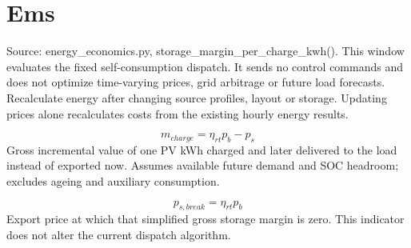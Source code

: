 \documentclass[10pt,a4paper]{article}
\begin{document}
\section{Ems}
Source: energy\_economics.py, storage\_margin\_per\_charge\_kwh(). This window evaluates the fixed self-consumption dispatch. It sends no control commands and does not optimize time-varying prices, grid arbitrage or future load forecasts. Recalculate energy after changing source profiles, layout or storage. Updating prices alone recalculates costs from the existing hourly energy results.

\begin{equation}
m_{charge}=\eta_{rt}p_b-p_s
\end{equation}
Gross incremental value of one PV kWh charged and later delivered to the load instead of exported now. Assumes available future demand and SOC headroom; excludes ageing and auxiliary consumption.

\begin{equation}
p_{s,break}=\eta_{rt}p_b
\end{equation}
Export price at which that simplified gross storage margin is zero. This indicator does not alter the current dispatch algorithm.
\end{document}
